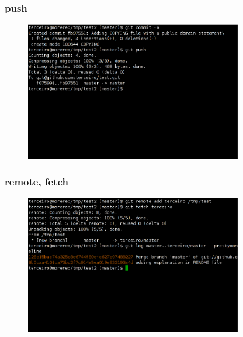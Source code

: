 \documentclass{beamer}
\begin{document}
\begin{frame}
  \frametitle{push}
  \begin{figure}[h]
    \begin{center}
      \includegraphics[width=0.85\textwidth]{figs/git-screenshot-push.eps}
    \end{center}
    \label{fig:git-push}
  \end{figure}
\end{frame}

\begin{frame}
  \frametitle{remote, fetch}
  \begin{figure}[h]
    \begin{center}
      \includegraphics[width=0.85\textwidth]{figs/git-screenshot-remote-fetch.eps}
    \end{center}
    \label{fig:git-remote-fetch}
  \end{figure}
\end{frame}

\end{document}
